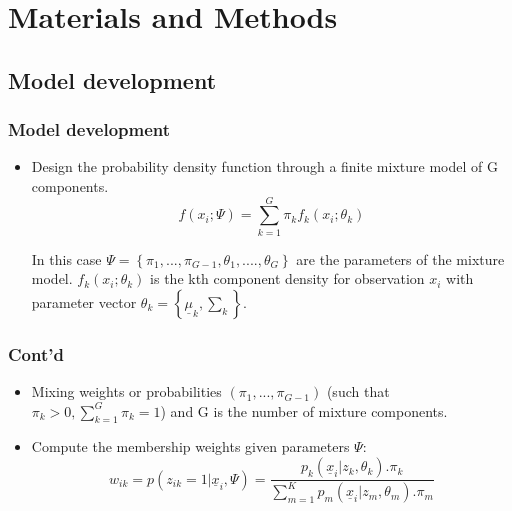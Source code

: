 \documentclass[unknownkeysallowed]{beamer}
\begin{document}
\section{Materials and Methods}
\subsection{Model development}
\begin{frame}
	\frametitle{\textbf{Model development}}
	\begin{itemize}
	\item Design the probability density function through a finite mixture model of G components.
		\begin{equation}
			f(x_i;\Psi) = \sum\limits_{k=1}^{G} \pi_{k}f_{k}\left(x_{i}; \theta_{k} \right)	
		\end{equation} 
	
	In this case $\Psi = \left\{\pi_{1}, ..., \pi_{G-1}, \theta_{1},....,\theta_{G}\right\}$ are the parameters of the mixture model. $f_{k}\left(x_{i}; \theta_{k}\right)$ is the kth component density for observation \textbf{$x_{i}$} with parameter vector \textbf{$\theta_{k} = \left\{\underline{\mu}_{k}, \sum_{k}\right\}$}.		
	\end{itemize}
\end{frame}
\begin{frame}
	\frametitle{\textbf{Cont'd}}
	\begin{itemize}
		\item Mixing weights or probabilities $\left(\pi_{1}, ..., \pi_{G-1}\right)$ (such that $\pi_{k} > 0, \sum\limits_{k=1}^{G} \pi_{k} = 1$) and G is the number of mixture components.
		\item Compute the membership weights given parameters $\Psi$:
		\begin{equation}
			w_{ik} = p\left(z_{ik} = 1|\underline{x}_{i},\Psi\right) = \frac{p_{k}\left(\underline{x}_{i}|z_{k}, \theta_{k}\right).\pi_{k}}{\sum\limits_{m=1}^{K} p_{m}\left(\underline{x}_{i}|z_{m}, \theta_{m}\right).\pi_{m}}
		\end{equation}
	\end{itemize}
\end{frame}
\end{document}
